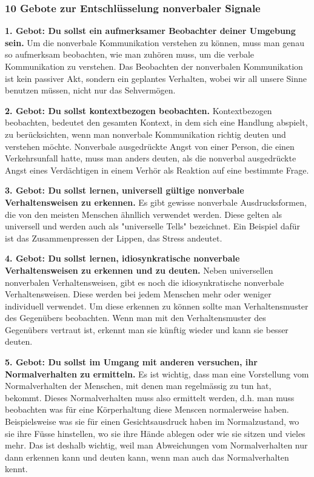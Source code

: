 \subsubsection{10 Gebote zur Entschlüsselung nonverbaler Signale}
\hskip 12pt\relax\textbf{1. Gebot: Du sollst ein aufmerksamer Beobachter deiner Umgebung sein.}
Um die nonverbale Kommunikation verstehen zu können, muss man genau so aufmerksam beobachten, wie man zuhören muss, um die verbale Kommunikation zu verstehen.
Das Beobachten der nonverbalen Kommunikation ist kein passiver Akt, sondern ein geplantes Verhalten, wobei wir all unsere
Sinne benutzen müssen, nicht nur das Sehvermögen.

\par\textbf{2. Gebot: Du sollst kontextbezogen beobachten.}
Kontextbezogen beobachten, bedeutet den gesamten Kontext, in dem sich eine Handlung abspielt, zu berücksichten, wenn man nonverbale
Kommunikation richtig deuten und verstehen möchte. Nonverbale ausgedrückte Angst von einer Person, die einen Verkehrsunfall hatte, muss man anders deuten,
als die nonverbal ausgedrückte Angst eines Verdächtigen in einem Verhör als Reaktion auf eine bestimmte Frage.

\par\textbf{3. Gebot: Du sollst lernen, universell gültige nonverbale Verhaltensweisen zu erkennen.}
Es gibt gewisse nonverbale Ausdrucksformen, die von den meisten Menschen ähnllich verwendet werden.
Diese gelten als universell und werden auch als "universelle Tells" bezeichnet. Ein Beispiel dafür ist das Zusammenpressen der Lippen, das Stress andeutet.

\par\textbf{4. Gebot: Du sollst lernen, idiosynkratische nonverbale Verhaltensweisen zu erkennen und zu deuten.}
Neben universellen nonverbalen Verhaltensweisen, gibt es noch die idiosynkratische nonverbale Verhaltensweisen.
Diese werden bei jedem Menschen mehr oder weniger individuell verwendet. Um diese erkennen zu können
sollte man Verhaltensmuster des Gegenübers beobachten. Wenn man mit den Verhaltensmuster des Gegenübers vertraut ist, 
erkennt man sie künftig wieder und kann sie besser deuten. 

\par\textbf{5. Gebot: Du sollst im Umgang mit anderen versuchen, ihr Normalverhalten zu ermitteln.}
Es ist wichtig, dass man eine Vorstellung vom Normalverhalten der Menschen, mit denen man regelmässig zu tun hat, bekommt. 
Dieses Normalverhalten muss also ermittelt werden, d.h. man muss beobachten was für eine Körperhaltung diese Menscen normalerweise haben.
Beispielsweise was sie für einen Gesichtsausdruck haben im Normalzustand, wo sie ihre Füsse hinstellen, wo sie ihre Hände ablegen oder wie sie sitzen und vieles mehr.
Das ist deshalb wichtig, weil man Abweichungen vom Normalverhalten nur dann erkennen kann und deuten kann, wenn man auch das Normalverhalten kennt.


